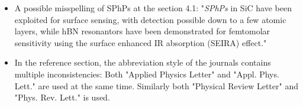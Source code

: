 \documentclass[12pt,a4paper]{article}
\begin{document}
\begin{itemize}
\item A possible misspelling of SPhPs at the section 4.1: 
"{\it SPhPs} in SiC have been exploited for surface sensing, with detection possible down to a few atomic layers, while hBN resonantors have been demonstrated for femtomolar sensitivity using the surface enhanced IR absorption (SEIRA) effect."

\item  In the reference section, the abbreviation style of the journals contains multiple inconsistencies: Both "Applied Physics Letter" and "Appl. Phys. Lett." are used at the same time. Similarly both "Physical Review Letter" and "Phys. Rev. Lett." is used. 

\end{itemize}
\end{document}
